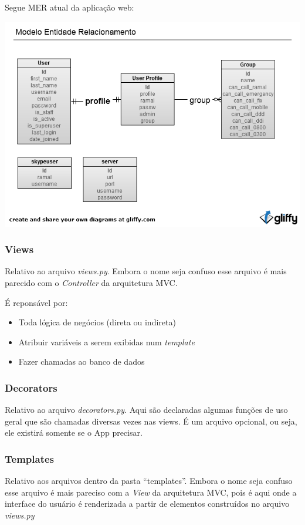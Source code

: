 \documentclass[letterpaper,10pt,brazil]{sphinxmanual}
\begin{document}
Segue MER atual da aplicação web:

\includegraphics{MER_PABX.png}


\subsubsection{Views}
\label{codigo:views}
Relativo ao arquivo \emph{views.py}. Embora o nome seja confuso esse arquivo é mais parecido com o \emph{Controller} da arquitetura MVC.

É reponsável por:
\begin{itemize}
\item {} 
Toda lógica de negócios (direta ou indireta)

\item {} 
Atribuir variáveis a serem exibidas num \emph{template}

\item {} 
Fazer chamadas ao banco de dados

\end{itemize}


\subsubsection{Decorators}
\label{codigo:decorators}
Relativo ao arquivo \emph{decorators.py}. Aqui são declaradas algumas funções de uso geral que são chamadas diversas vezes nas views. É um arquivo opcional, ou seja, ele existirá somente se o App precisar.


\subsubsection{Templates}
\label{codigo:templates}
Relativo aos arquivos dentro da pasta ``templates''. Embora o nome seja confuso esse arquivo é mais pareciso com a \emph{View} da arquitetura MVC, pois é aqui onde a interface do usuário é renderizada a partir de elementos construídos no arquivo \emph{views.py}
\end{document}
